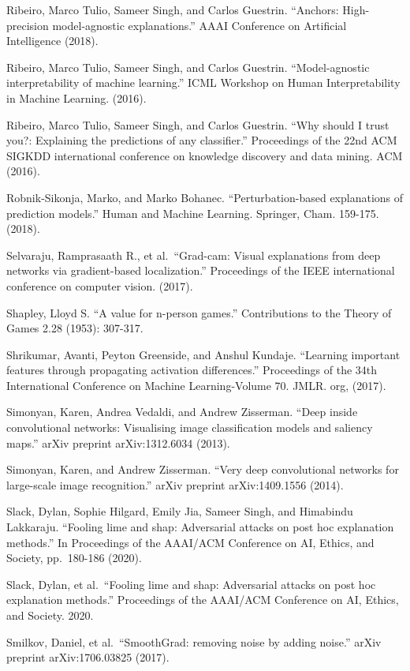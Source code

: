 \documentclass[
  10pt,
]{scrbook}
\begin{document}
Ribeiro, Marco Tulio, Sameer Singh, and Carlos Guestrin. ``Anchors: High-precision model-agnostic explanations.'' AAAI Conference on Artificial Intelligence (2018).

Ribeiro, Marco Tulio, Sameer Singh, and Carlos Guestrin. ``Model-agnostic interpretability of machine learning.'' ICML Workshop on Human Interpretability in Machine Learning. (2016).

Ribeiro, Marco Tulio, Sameer Singh, and Carlos Guestrin. ``Why should I trust you?: Explaining the predictions of any classifier.'' Proceedings of the 22nd ACM SIGKDD international conference on knowledge discovery and data mining. ACM (2016).

Robnik-Sikonja, Marko, and Marko Bohanec. ``Perturbation-based explanations of prediction models.'' Human and Machine Learning. Springer, Cham. 159-175. (2018).

Selvaraju, Ramprasaath R., et al.~``Grad-cam: Visual explanations from deep networks via gradient-based localization.'' Proceedings of the IEEE international conference on computer vision. (2017).

Shapley, Lloyd S. ``A value for n-person games.'' Contributions to the Theory of Games 2.28 (1953): 307-317.

Shrikumar, Avanti, Peyton Greenside, and Anshul Kundaje. ``Learning important features through propagating activation differences.'' Proceedings of the 34th International Conference on Machine Learning-Volume 70. JMLR. org, (2017).

Simonyan, Karen, Andrea Vedaldi, and Andrew Zisserman. ``Deep inside convolutional networks: Visualising image classification models and saliency maps.'' arXiv preprint arXiv:1312.6034 (2013).

Simonyan, Karen, and Andrew Zisserman. ``Very deep convolutional networks for large-scale image recognition.'' arXiv preprint arXiv:1409.1556 (2014).

Slack, Dylan, Sophie Hilgard, Emily Jia, Sameer Singh, and Himabindu Lakkaraju. ``Fooling lime and shap: Adversarial attacks on post hoc explanation methods.'' In Proceedings of the AAAI/ACM Conference on AI, Ethics, and Society, pp.~180-186 (2020).

Slack, Dylan, et al.~``Fooling lime and shap: Adversarial attacks on post hoc explanation methods.'' Proceedings of the AAAI/ACM Conference on AI, Ethics, and Society. 2020.

Smilkov, Daniel, et al.~``SmoothGrad: removing noise by adding noise.'' arXiv preprint arXiv:1706.03825 (2017).
\end{document}
